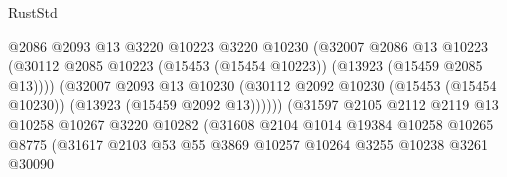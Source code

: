 \begin{lexlean}{RustStd}
\begin{coremodule}
                                          @2086
                                          @2093
                                          @13
                                          @3220
                                          @10223
                                          @3220
                                          @10230
                                          (@32007
                                            @2086
                                            @13
                                            @10223
                                            (@30112
                                              @2085
                                              @10223
                                              (@15453 (@15454 @10223))
                                              (@13923 (@15459 @2085 @13))))
                                          (@32007
                                            @2093
                                            @13
                                            @10230
                                            (@30112
                                              @2092
                                              @10230
                                              (@15453 (@15454 @10230))
                                              (@13923 (@15459 @2092 @13))))))
                                      (@31597
                                        @2105
                                        @2112
                                        @2119
                                        @13
                                        @10258
                                        @10267
                                        @3220
                                        @10282
                                        (@31608
                                          @2104
                                          @1014
                                          @19384
                                          @10258
                                          @10265
                                          @8775
                                          (@31617
                                            @2103
                                            @53
                                            @55
                                            @3869
                                            @10257
                                            @10264
                                            @3255
                                            @10238
                                            @3261
                                            @30090

\end{coremodule}
\end{lexlean}
